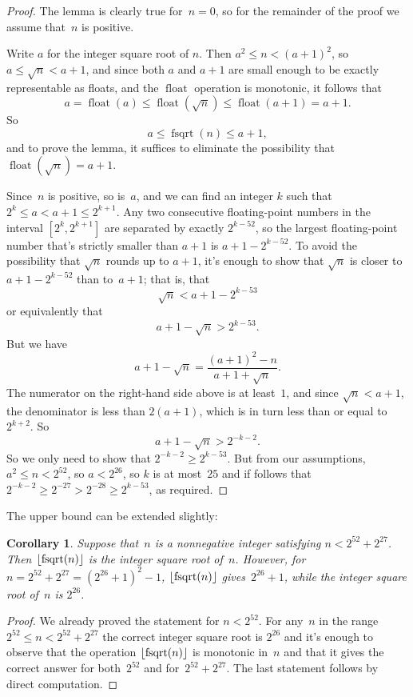 \documentclass[a4paper]{article}
\DeclarePairedDelimiter\floor{\lfloor}{\rfloor}
\DeclareMathOperator{\fsqrt}{fsqrt}
\DeclareMathOperator{\float}{float}
\theoremstyle{plain}
\newtheorem{corollary}[theorem]{Corollary}
\theoremstyle{definition}
\begin{document}
\begin{proof}
  The lemma is clearly true for~$n=0$, so for the remainder of the proof
  we assume that~$n$ is positive.

  Write $a$ for the integer square root of $n$. Then $a^2 \le n < (a + 1)^2$,
  so $a \le \sqrt n < a + 1$, and since both $a$ and $a + 1$ are small
  enough to be exactly representable as floats, and the $\float$ operation
  is monotonic, it follows that
  $$a = \float(a) \le \float(\sqrt n) \le \float(a + 1) = a + 1.$$
  So
  $$a \le \fsqrt(n) \le a + 1,$$
  and to prove the lemma, it suffices to eliminate
  the possibility that~$\float(\sqrt n) = a + 1$.

  Since~$n$ is positive, so is~$a$, and we can find an integer $k$ such that
  $2^k \le a < a + 1 \le 2^{k + 1}$. Any two consecutive floating-point numbers
  in the interval $[2^k, 2^{k+1}]$ are separated by exactly $2^{k-52}$, so the
  largest floating-point number that's strictly smaller than $a + 1$ is $a + 1
  - 2^{k - 52}.$ To avoid the possibility that $\sqrt n$ rounds up to $a + 1$,
  it's enough to show that $\sqrt n$ is closer to $a + 1 - 2^{k-52}$ than to~$a
  + 1$; that is, that
  $$\sqrt n < a + 1 - 2^{k-53}$$
  or equivalently that
  $$a + 1 - \sqrt n > 2^{k - 53}.$$
  But we have
  $$a + 1 - \sqrt n = \frac{(a + 1)^2 - n}{a + 1 + \sqrt n}.$$
  The numerator on the right-hand side above is at least~$1$, and since $\sqrt
  n < a + 1$, the denominator is less than $2(a+1)$, which is in turn less than
  or equal to $2^{k+2}$. So
  $$a + 1 - \sqrt n > 2^{-k-2}.$$ So we only need to show that $2^{-k-2} \ge
  2^{k-53}$. But from our assumptions, $a^2 \le n < 2^{52}$, so $a < 2^{26}$,
  so $k$ is at most~$25$ and if follows that $2^{-k-2} \ge 2^{-27} > 2^{-28}
  \ge 2^{k-53}$, as required.
\end{proof}

The upper bound can be extended slightly:

\begin{corollary}
  Suppose that~$n$ is a nonnegative integer satisfying $n < 2^{52} + 2^{27}$.
  Then $\floor{\fsqrt(n)}$ is the integer square root of~$n$. However, for~$n =
  2^{52} + 2^{27} = (2^{26} + 1)^2 - 1$, $\floor{\fsqrt(n)}$ gives~$2^{26} +
  1$, while the integer square root of~$n$ is $2^{26}$.
\end{corollary}

\begin{proof}
  We already proved the statement for $n < 2^{52}$. For any~$n$ in the range
  $2^{52} \le n < 2^{52} + 2^{27}$ the correct integer square root is $2^{26}$
  and it's enough to observe that the operation $\floor{\fsqrt(n)}$ is
  monotonic in~$n$ and that it gives the correct answer for both~$2^{52}$ and
  for~$2^{52} + 2^{27}$. The last statement follows by direct computation.
\end{proof}
\end{document}
